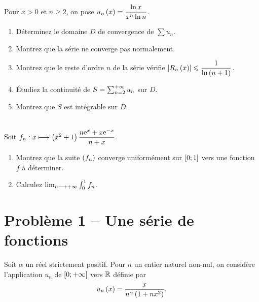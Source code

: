 \begin{exo}
Pour \(x>0\) et \(n\geq2\), on pose \(u_n\left(x\right)=\dfrac{\ln x}{x^n\ln n}\).

\begin{enumerate}
    \item Déterminez le domaine \(D\) de convergence de \(\sum u_n\). \\
    \item Montrez que la série ne converge pas normalement. \\
    \item Montrez que le reste d'ordre \(n\) de la série vérifie \(\left\lvert R_n\left(x\right)\right\rvert\leqslant\dfrac{1}{\ln\left(n+1\right)}\). \\
    \item Étudiez la continuité de \(S=\sum_{n=2}^{+\infty}u_n\) sur \(D\). \\
    \item Montrez que \(S\) est intégrable sur \(D\).
\end{enumerate}
\end{exo}

\begin{exo}~\\
Soit \(f_n:x\longmapsto\left(x^2+1\right)\dfrac{n\mathrm{e}^{x}+x\mathrm{e}^{-x}}{n+x}\).

\begin{enumerate}
    \item Montrez que la suite \(\left(f_n\right)\) converge uniformément sur \(\left[0;1\right]\) vers une fonction \(f\) à déterminer. \\
    \item Calculez \(\lim_{n\longrightarrow+\infty}\int_0^1f_n\).
\end{enumerate}
\end{exo}

\section*{Problème 1 -- Une série de fonctions}
\setcounter{q}{0}

Soit \(\alpha\) un réel strictement positif. Pour \(n\) un entier naturel non-nul, on considère l'application \(u_n\) de \(\left[0;+\infty\right[\) vers \(\mathbb{R}\) définie par \[u_n\left(x\right)=\dfrac{x}{n^\alpha\left(1+nx^2\right)}.\]

